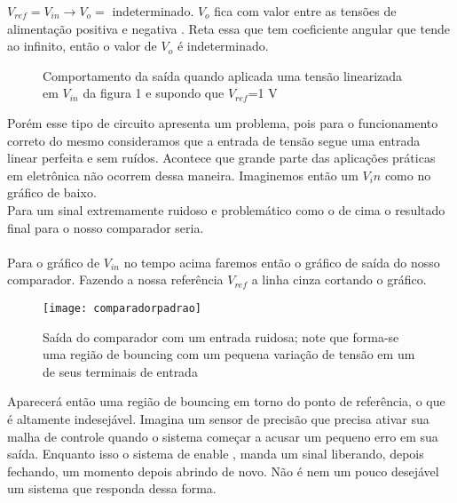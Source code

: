 \documentclass[11pt]{article}
\begin{document}
 $V_{ref}=V_{in} \rightarrow V_o=$ indeterminado. $V_o$ fica com valor entre as tensões de alimentação positiva e negativa . Reta essa que tem coeficiente angular que tende ao infinito, então o valor de $V_o$ é indeterminado.\\
\begin{figure}[!h]
 \begin{center}
\end{center}
\caption{Comportamento da saída quando aplicada uma tensão linearizada em $V_{in}$ da figura 1 e supondo que $V_{ref}$=1 V }
\end{figure}
Porém esse tipo de circuito apresenta um problema, pois para o funcionamento correto do mesmo consideramos que a entrada de tensão segue uma entrada linear perfeita e sem ruídos. Acontece que grande parte das aplicações práticas em eletrônica não ocorrem dessa maneira. Imaginemos então um $V_in$ como no gráfico de baixo.\\

Para um sinal extremamente ruidoso e problemático como o de cima o resultado final para o nosso comparador seria.\\\\
Para o gráfico de $V_{in}$ no tempo acima faremos então o gráfico de saída do nosso comparador. Fazendo a nossa referência $V_{ref}$ a linha cinza cortando o gráfico. \\
\begin{center}
\begin{figure}[!h]
\texttt{[image: comparadorpadrao]}
\caption{Saída do comparador com um entrada ruidosa; note que forma-se uma região de bouncing com um pequena variação de tensão em um de seus terminais de entrada}
\end{figure}
\end{center}
Aparecerá então uma região de bouncing em torno do ponto de referência, o que é altamente indesejável. Imagina um sensor de precisão que precisa ativar sua malha de controle quando o sistema começar a acusar um pequeno erro em sua saída. Enquanto isso o sistema de enable , manda um sinal liberando, depois fechando, um momento depois abrindo de novo. Não é nem um pouco desejável um sistema que responda dessa forma.\\
\end{document}
